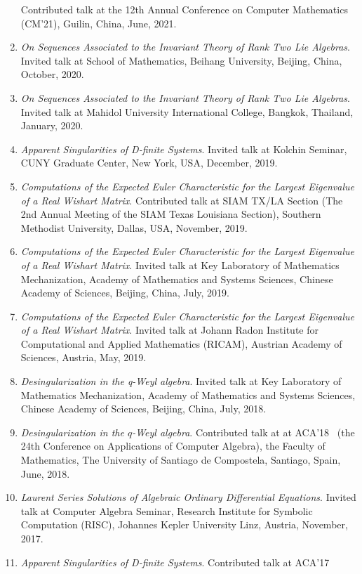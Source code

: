 \documentclass[a4paper,12pt]{article}
\begin{document}
\begin{enumerate}
Contributed talk at the 12th Annual Conference on Computer Mathematics (CM'21), Guilin, China, June, 2021.
\item {\em On Sequences Associated to the Invariant Theory of Rank Two Lie Algebras}.
Invited talk at School of Mathematics, Beihang University, Beijing, China, October, 2020.
\item {\em On Sequences Associated to the Invariant Theory of Rank Two Lie Algebras}.
Invited talk at Mahidol University International College, Bangkok, Thailand, January, 2020.
\item {\em Apparent Singularities of D-finite Systems}.
Invited talk at Kolchin Seminar, CUNY Graduate Center, New York, USA, December, 2019. 
\item {\em Computations of the Expected Euler Characteristic for the Largest Eigenvalue of a Real Wishart Matrix}.
Contributed talk at SIAM TX/LA Section (The 2nd Annual Meeting of the SIAM Texas Louisiana Section), Southern Methodist University, Dallas, USA, November, 2019.
\item {\em Computations of the Expected Euler Characteristic for the Largest Eigenvalue of a Real Wishart Matrix}.
Invited talk at Key Laboratory of Mathematics Mechanization, Academy of Mathematics and Systems Sciences,
 Chinese Academy of Sciences, Beijing, China, July, 2019. 
\item {\em Computations of the Expected Euler Characteristic for the Largest Eigenvalue of a Real Wishart Matrix}.
Invited talk at Johann Radon Institute for Computational and Applied Mathematics (RICAM), Austrian Academy of Sciences, 
Austria, May, 2019.
 \item {\em Desingularization in the q-Weyl algebra}. 
 Invited talk at Key Laboratory of Mathematics Mechanization, Academy of Mathematics and Systems Sciences,
 Chinese Academy of Sciences, Beijing, China, July, 2018. 
 \item {\em Desingularization in the $q$-Weyl algebra}. 
 Contributed talk at at ACA'18 
 \ (the 24th Conference on Applications of Computer Algebra), the Faculty of Mathematics, 
 The University of Santiago de Compostela, Santiago, Spain, June, 2018.
 \item {\em Laurent Series Solutions of Algebraic Ordinary Differential Equations}. 
 Invited talk at Computer Algebra Seminar, Research Institute for Symbolic Computation (RISC), Johannes Kepler University Linz, 
 Austria, November, 2017.
 \item {\em Apparent Singularities of D-finite Systems}. Contributed talk at ACA'17 

\end{enumerate}
\end{document}
